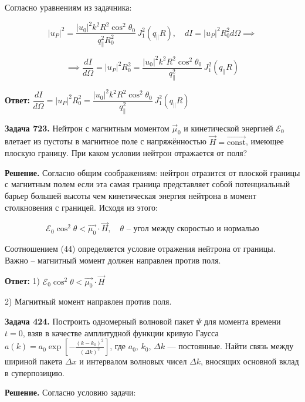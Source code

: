 \documentclass[a4paper,12pt]{article}
\begin{document}
	\quad Согласно уравнениям из задачника: 
	
	\begin{equation}
		|u_P|^2 = \dfrac{|u_0|^2 k^2 R^2 \cos^2\theta_0}{q_{\parallel}^2 R_0^2} \, J_1^2(q_{\parallel} R), \quad dI = |u_P|^2 R_0^2 d\Omega \implies 
	\end{equation}
	
	\begin{equation}
		\implies \dfrac{dI}{d\Omega} = |u_P|^2 R_0^2 = \frac{|u_0|^2 k^2 R^2 \cos^2\theta_0}{q_{\parallel}^2} \, J_1^2(q_{\parallel} R)
	\end{equation}
	
	\quad \textbf{Ответ:} $\dfrac{dI}{d\Omega} = |u_P|^2 R_0^2 = \dfrac{|u_0|^2 k^2 R^2 \cos^2\theta_0}{q_{\parallel}^2} \, J_1^2(q_{\parallel} R)$
	
	\quad \textbf{Задача 723.} Нейтрон с магнитным моментом $\vec{\mu}_0$ и кинетической энергией $\mathcal{E}_0$ влетает из пустоты в магнитное поле с напряжённостью $\vec{H} = \vec{\text{const}}$, имеющее плоскую границу. При каком условии нейтрон отражается от поля?
	
	\quad \textbf{Решение.} Согласно общим соображениям: нейтрон отразится от плоской границы с магнитным полем если эта самая граница представляет собой потенциальный барьер большей высоты чем кинетическая энергия нейтрона в момент столкновения с границей. Исходя из этого:
	
	\begin{equation}
		\mathcal{E}_0 \cos^2 \theta < \vec{\mu_0} \cdot  \vec{H}, \quad \theta \text{ -- угол между скоростью и нормалью} 
	\end{equation}
	
	\quad Соотношением (44) определяется условие отражения нейтрона от границы. Важно -- магнитный момент должен направлен против поля. 
	
	\quad \textbf{Ответ:} 1) $\mathcal{E}_0 \cos^2 \theta < \vec{\mu_0} \cdot  \vec{H}$
	
	2) Магнитный момент направлен против поля. 
	
	\quad \textbf{Задача 424.} Построить одномерный волновой пакет $\Psi$ для момента времени $t = 0$, взяв в качестве амплитудной функции кривую Гаусса $a(k) = a_0 \exp[-\frac{(k - k_0)^2}{(\Delta k)^2}]$, где $a_0$, $k_0$, $\Delta k$ — постоянные. Найти связь между шириной пакета $\Delta x$ и интервалом волновых чисел $\Delta k$, вносящих основной вклад в суперпозицию.
	
	\quad \textbf{Решение.} Согласно условию задачи:
	
\end{document}
